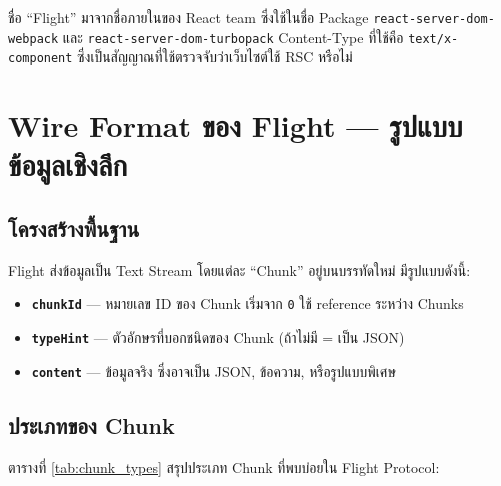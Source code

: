 \documentclass[12pt,oneside]{report}
\begin{document}
ชื่อ ``Flight'' มาจากชื่อภายในของ React team ซึ่งใช้ในชื่อ Package \texttt{react-server-dom-webpack} และ \texttt{react-server-dom-turbopack} Content-Type ที่ใช้คือ \texttt{text/x-component} ซึ่งเป็นสัญญาณที่ใช้ตรวจจับว่าเว็บไซต์ใช้ RSC หรือไม่

\section{Wire Format ของ Flight — รูปแบบข้อมูลเชิงลึก}

\subsection{โครงสร้างพื้นฐาน}

Flight ส่งข้อมูลเป็น Text Stream โดยแต่ละ ``Chunk'' อยู่บนบรรทัดใหม่ มีรูปแบบดังนี้:

\begin{center}
\end{center}

\begin{itemize}[leftmargin=1.5cm]
    \item \textbf{\texttt{chunkId}} — หมายเลข ID ของ Chunk เริ่มจาก \texttt{0} ใช้ reference ระหว่าง Chunks
    \item \textbf{\texttt{typeHint}} — ตัวอักษรที่บอกชนิดของ Chunk (ถ้าไม่มี = เป็น JSON)
    \item \textbf{\texttt{content}} — ข้อมูลจริง ซึ่งอาจเป็น JSON, ข้อความ, หรือรูปแบบพิเศษ
\end{itemize}

\newpage

\subsection{ประเภทของ Chunk}

ตารางที่ \ref{tab:chunk_types} สรุปประเภท Chunk ที่พบบ่อยใน Flight Protocol:
\end{document}
